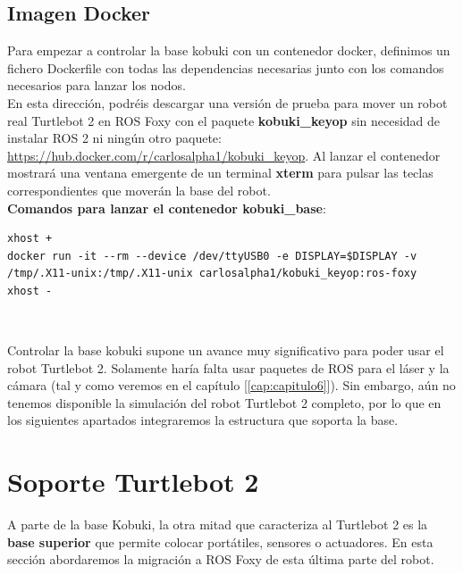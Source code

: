 \subsection{Imagen Docker}
\label{subsec:kobuki_base_docker}

Para empezar a controlar la base kobuki con un contenedor docker, definimos un fichero Dockerfile con todas las dependencias necesarias junto con los comandos necesarios para lanzar los nodos.\\

En esta dirección, podréis descargar una versión de prueba para mover un robot real Turtlebot 2 en ROS Foxy con el paquete \textbf{kobuki\_keyop} sin necesidad de instalar ROS 2 ni ningún otro paquete: \url{https://hub.docker.com/r/carlosalpha1/kobuki_keyop}. Al lanzar el contenedor mostrará una ventana emergente de un terminal \textbf{xterm} para pulsar las teclas correspondientes que moverán la base del robot.\\

\textbf{Comandos para lanzar el contenedor kobuki\_base}:\\
\begin{lstlisting}
xhost +
docker run -it --rm --device /dev/ttyUSB0 -e DISPLAY=$DISPLAY -v /tmp/.X11-unix:/tmp/.X11-unix carlosalpha1/kobuki_keyop:ros-foxy
xhost -
\end{lstlisting}\

Controlar la base kobuki supone un avance muy significativo para poder usar el robot Turtlebot 2. Solamente haría falta usar paquetes de ROS para el láser y la cámara (tal y como veremos en el capítulo [\ref{cap:capitulo6}]). Sin embargo, aún no tenemos disponible la simulación del robot Turtlebot 2 completo, por lo que en los siguientes apartados integraremos la estructura que soporta la base.\\



\section{Soporte Turtlebot 2}
\label{sec:soporte_turtlebot2}

A parte de la base Kobuki, la otra mitad que caracteriza al Turtlebot 2 es la \textbf{base superior} que permite colocar portátiles, sensores o actuadores. En esta sección abordaremos la migración a ROS Foxy de esta última parte del robot.\\

